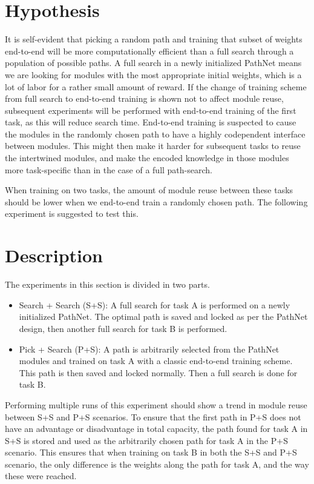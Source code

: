 \section{Hypothesis}
It is self-evident that picking a random path and training that subset of weights end-to-end will be more computationally efficient than a full search through a population of possible paths. A full search in a newly initialized PathNet means we are looking for modules with the most appropriate initial weights, which is a lot of labor for a rather small amount of reward. If the change of training scheme from full search to end-to-end training is shown not to affect module reuse, subsequent experiments will be performed with end-to-end training of the first task, as this will reduce search time. End-to-end training is suspected to cause the modules in the randomly chosen path to have a highly codependent interface between modules. This might then make it harder for subsequent tasks to reuse the intertwined modules, and make the encoded knowledge in those modules more task-specific than in the case of a full path-search. 

When training on two tasks, the amount of module reuse between these tasks should be lower when we end-to-end train a randomly chosen path. The following experiment is suggested to test this. 

\section{Description}
The experiments in this section is divided in two parts. 
\begin{itemize}
    \item Search + Search (S+S): A full search for task A is performed on a newly initialized PathNet. The optimal path is saved and locked as per the PathNet design, then another full search for task B is performed.
    \item Pick + Search (P+S): A path is arbitrarily selected from the PathNet modules and trained on task A with a classic end-to-end training scheme. This path is then saved and locked normally. Then a full search is done for task B.
\end{itemize}
Performing multiple runs of this experiment should show a trend in module reuse between S+S and P+S scenarios. To ensure that the first path in P+S does not have an advantage or disadvantage in total capacity,  the path found for task A in S+S is stored and used as the arbitrarily chosen path for task A in the P+S scenario. This ensures that when training on task B in both the S+S and P+S scenario, the only difference is the weights along the path for task A, and the way these were reached. 

